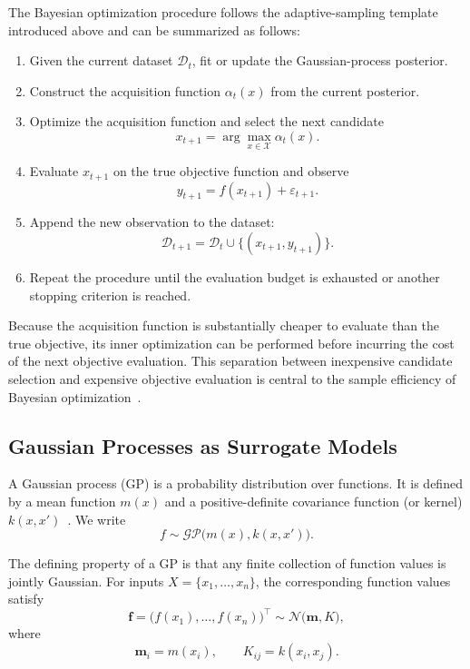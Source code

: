The Bayesian optimization procedure follows the adaptive-sampling template
introduced above and can be summarized as follows:

\begin{enumerate}
    \item Given the current dataset $\mathcal{D}_t$, fit or update the
    Gaussian-process posterior.

    \item Construct the acquisition function $\alpha_t(x)$ from the current
    posterior.

    \item Optimize the acquisition function and select the next candidate
    \[
        x_{t+1} = \arg\max_{x \in \mathcal{X}} \alpha_t(x).
    \]

    \item Evaluate $x_{t+1}$ on the true objective function and observe
    \[
        y_{t+1} = f(x_{t+1}) + \varepsilon_{t+1}.
    \]

    \item Append the new observation to the dataset:
    \[
        \mathcal{D}_{t+1}
        =
        \mathcal{D}_t \cup \{(x_{t+1},y_{t+1})\}.
    \]

    \item Repeat the procedure until the evaluation budget is exhausted or
    another stopping criterion is reached.
\end{enumerate}

Because the acquisition function is substantially cheaper to evaluate than the true objective, its inner optimization can be performed before incurring the cost of the next objective evaluation. This separation between inexpensive candidate selection and expensive objective evaluation is central to the sample efficiency of Bayesian optimization~\cite{snoek2012practical,di2024active,balandat2019botorch}.

\subsection{Gaussian Processes as Surrogate Models}
A Gaussian process (GP) is a probability distribution over functions. It is
defined by a mean function $m(x)$ and a positive-definite covariance function
(or kernel) $k(x,x')$~\cite{williams1995gaussian,rasmussen2010gaussian}. We write
\[
    f \sim \mathcal{GP}\bigl(m(x), k(x,x')\bigr).
\]

The defining property of a GP is that any finite collection of function
values is jointly Gaussian. For inputs
$X = \{x_1,\ldots,x_n\}$, the corresponding function values satisfy
\[
    \mathbf{f}
    =
    \bigl(f(x_1),\ldots,f(x_n)\bigr)^\top
    \sim
    \mathcal{N}\bigl(\mathbf{m},K\bigr),
\]
where
\[
    \mathbf{m}_i = m(x_i),
    \qquad
    K_{ij} = k(x_i,x_j).
\]

